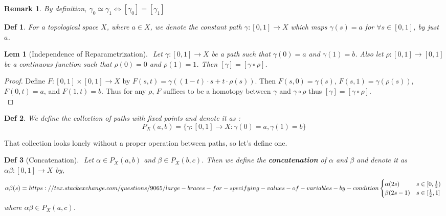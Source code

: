 \documentclass[paper=a4, fontsize=11pt]{scrartcl}
\newtheorem{definition}{Def}
\newtheorem{lemma}{Lem}
\newtheorem*{remark}{Remark}
\begin{document}
\begin{remark}
	By definition, $\gamma_0 \simeq \gamma_1 \iff [\gamma_0]=[\gamma_1]$\\
\end{remark}

\begin{definition}
	For a topological space $X$, where $a \in X$, we denote the constant path $\gamma:[0,1]\to X$ which maps $\gamma(s)=a$ for $\forall s \in [0,1]$, by just $a$.\\
\end{definition}

\begin{lemma}[Independence of Reparametrization] $ $\newline
	Let $\gamma:[0,1]\to X$ be a path such that $\gamma(0)=a$ and $\gamma(1)=b$. Also let $\rho:[0,1]\to [0,1]$ be a continuous function such that $\rho(0)=0$ and $\rho(1)=1$. Then $[\gamma]=[\gamma \circ \rho]$.\\
\end{lemma}

\begin{proof}
	Define $F:[0,1]\times[0,1] \to X$ by $F(s,t) = \gamma((1-t)\cdot s + t \cdot \rho(s))$. Then $F(s,0)=\gamma(s)$, $F(s,1)=\gamma(\rho(s))$, $F(0,t)=a$, and $F(1,t)=b$. Thus for any $\rho$, $F$ suffices to be a homotopy between $\gamma$ and $\gamma \circ \rho$ thus $[\gamma]=[\gamma \circ \rho]$.\\
\end{proof}

\begin{definition}
	We define the collection of paths with fixed points and denote it as :
	\begin{equation}\nonumber
			P_X (a,b)=\{\gamma:[0,1]\to X :\gamma(0)=a,\gamma(1)=b\}
	\end{equation}
\end{definition}
\vspace{0.15in}

That collection looks lonely without a proper operation between paths, so let's define one.\\

\begin{definition}[Concatenation]  $ $ \newline
	Let $\alpha \in P_X(a,b)$ and $\beta \in P_X(b,c)$. Then we define the \textbf{concatenation} of $\alpha$ and $\beta$ and denote it as $\alpha\beta : [0,1] \to X$ by,
	\begin{equation}\nonumber
		\alpha\beta(s) = https://tex.stackexchange.com/questions/9065/large-braces-for-specifying-values-of-variables-by-condition
		\begin{cases}
		\alpha(2s)  & s \in [0,\frac{1}{2})\\
		\beta(2s-1) & s \in [\frac{1}{2},1]
		\end{cases} \\
	\end{equation}
	where $\alpha\beta \in P_X(a,c)$.\\
\end{definition}
\end{document}
